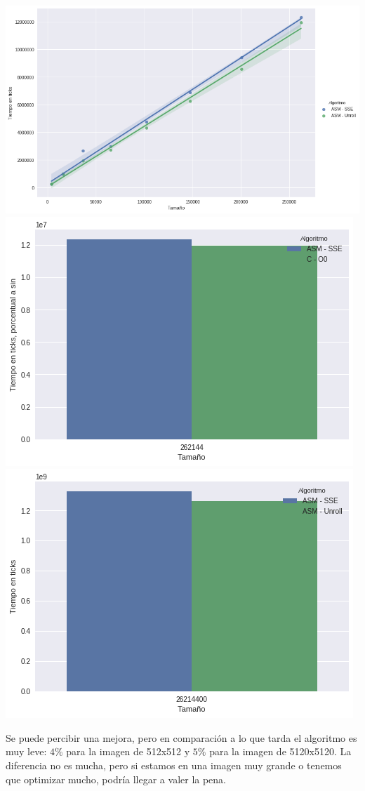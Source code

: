 \begin{center} 
	\includegraphics[scale=0.5]{img/maxCloser_Unroll_compare.png}
	\includegraphics[scale=0.5]{img/maxCloser_Unroll_small.png} %
	\includegraphics[scale=0.5]{img/maxCloser_Unroll_big.png} %
\end{center}

Se puede percibir una mejora, pero en comparación a lo que tarda el algoritmo es muy leve: $4\%$ para la imagen de 512x512 y $5\%$ para la imagen de 5120x5120. La diferencia no es mucha, pero si estamos en una imagen muy grande o tenemos que optimizar mucho, podría llegar a valer la pena. 